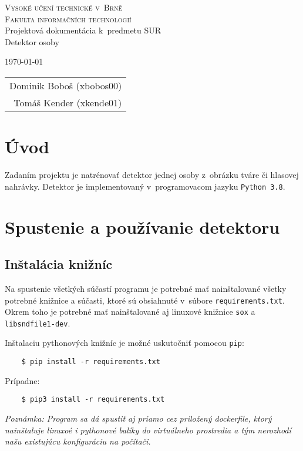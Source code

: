 \documentclass[11pt, a4paper]{article}
\begin{document}
	\begin{titlepage}
		\begin{center}
			\Huge
			\textsc{Vysoké učení technické v~Brně} \\
			\huge
			\textsc{Fakulta informačních technologií} \\
			\LARGE
			Projektová dokumentácia k~predmetu SUR \\
			\Huge
			Detektor osoby
		\end{center}

		{\Large
			\today
			\hfill
			\begin{tabular}{r}
			Dominik Boboš (xbobos00) \\
			Tomáš Kender (xkende01)
			\end{tabular}
		}
	\end{titlepage}
		
	\section{Úvod}
	Zadaním projektu je natrénovať detektor jednej osoby z~obrázku tváre či hlasovej nahrávky. Detektor je implementovaný v~programovacom jazyku \texttt{Python\,3.8}. 
	
	\section{Spustenie a používanie detektoru}
		\subsection{Inštalácia knižníc}
	Na spustenie všetkých súčastí programu je potrebné mať nainštalované všetky potrebné knižnice a súčasti, ktoré sú obsiahnuté v~súbore \texttt{requirements.txt}. 
	Okrem toho je potrebné mať nainštalované aj linuxové knižnice \texttt{sox} a \texttt{libsndfile1-dev}.

	Inštalaciu pythonových knižníc je možné uskutočniť pomocou \texttt{pip}:
			\begin{verbatim}
    $ pip install -r requirements.txt
			\end{verbatim}
			
	Prípadne:
			\begin{verbatim}
    $ pip3 install -r requirements.txt
			\end{verbatim}
			\emph{Poznámka: Program sa dá spustiť aj priamo cez priložený dockerfile, ktorý nainštaluje linuxoé i pythonové balíky do virtuálneho prostredia a tým nerozhodí našu existujúcu konfiguráciu na počítači.}
\end{document}
